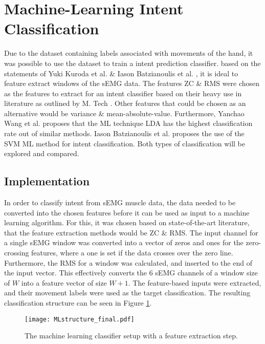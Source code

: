 \documentclass[../main.tex]{subfiles}
\begin{document}
\section{Machine-Learning Intent Classification}
\label{sec:machine-learning}

Due to the dataset containing labels associated with movements of the hand, it was possible to use the dataset to train a intent prediction classifier.
based on the statements of Yuki Kuroda et al. \cite{Yuki2023} \& Iason Batzianoulis et al.  \cite{Batzianoulis2018}, it is ideal to feature extract windows of the sEMG data.
The features \gls{ZC} \& \gls{RMS} were chosen as the features to extract for an intent classifier based on their heavy use in literature as outlined by M. Tech \cite{Tech2015}.
Other features that could be chosen as an alternative would be variance \& mean-absolute-value.
Furthermore, Yanchao Wang et al. \cite{YanchaoWang2022} proposes that the \gls{ML} technique \gls{LDA} has the highest classification rate out of similar methods.
Iason Batzianoulis et al. \cite{Batzianoulis2018} proposes the use of the \gls{SVM} \gls{ML} method for intent classification.
Both types of classification will be explored and compared.

\subsection{Implementation}

In order to classify intent from sEMG muscle data, the data needed to be converted into the chosen features before it can be used as input to a machine learning algorithm.
For this, it was chosen based on state-of-the-art literature, that the feature extraction methods would be \gls{ZC} \& \gls{RMS}.
The input channel for a single sEMG window was converted into a vector of zeros and ones for the zero-crossing features, where a one is set if the data crosses over the zero line.
Furthermore, the RMS for a window was calculated, and inserted to the end of the input vector. This effectively converts the 6 sEMG channels of a window size of $W$ into a feature vector of size $W+1$.
The feature-based inputs were extracted, and their movement labels were used as the target classification.
The resulting classification structure can be seen in Figure \ref{fig:mlclassifier}.

\begin{figure}[H]
\begin{center}
\texttt{[image: MLstructure\_final.pdf]}
\caption{The machine learning classifier setup with a feature extraction step.}
\label{fig:mlclassifier}
\end{center}
\end{figure}
\end{document}
